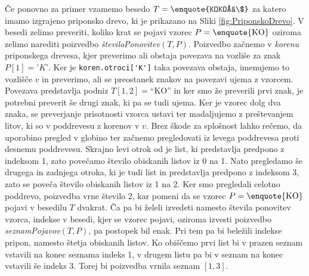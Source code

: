 Če ponovno za primer vzamemo besedo $T=\text{\enquote{KOKOŠ\$}}$ za katero imamo izgrajeno priponsko drevo, ki je prikazano na Sliki \ref{fig:PriponskoDrevo}. V besedi zelimo preveriti, koliko krat se pojavi vzorec $P=\text{\enquote{KO}}$ oziroma zelimo narediti poizvedbo \textit{številoPonovitev}$(T,P)$. Poizvedbo začnemo v \textit{korenu} priponskega drevesa, kjer preverimo ali obstaja povezava na vozliše za znak $P[1]=\textit{'K'}$. Ker je \verb|koren.otroci['K']| taka povezava obstaja, imenujemo to vozlišče $v$ in preverimo, ali se preostanek znakov na povezavi ujema z vzorcem. Povezava predstavlja podniz $T[1,2]=$\enquote{KO} in ker smo že preverili prvi znak, je potrebni preverit še drugi znak, ki pa se tudi ujema. Ker je vzorec dolg dva znaka, se preverjanje prisotnosti vzorca ustavi ter madaljujemo z preštevanjem litov, ki so v poddrevesu z korenov v $v$. Brez škode za splošnost lahko rečemo, da uporabino pregled v globino ter začnemo pregledovati iz levega poddrevesa proti desnemu poddrevesu. Skrajno levi otrok od je list, ki predstavlja predpono z indeksom 1, zato povečamo število obiskanih listov iz 0 na 1. Nato pregledamo še drugega in zadnjega otroka, ki je tudi list in predstavlja predpono z indeksom 3, zato se poveča število obiskanih listov iz 1 na 2. Ker smo pregledali celotno poddrevo, poizvedba vrne število 2, kar pomeni da se vzorec $P=\text{\enquote{KO}}$ pojavi v besedilu $T$ dvakrat. Ča pa bi želeli izvedeti namesto števila ponovitev vzorca, indekse v besedi, kjer se vzorec pojavi, oziroma izvesti poizvedbo \textit{seznamPojavov}$(T,P)$, pa postopek bil enak. Pri tem pa bi beležili indekse pripon, namesto štetja obiskanih listov. Ko obiščemo prvi list bi v prazen seznam vstavili na konec seznama indeks 1, v drugem listu pa bi v seznam na konec vstavili še indeks 3. Torej bi poizvedba vrnila seznam $[1,3]$.